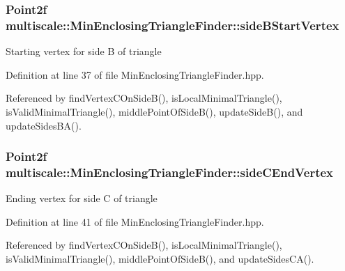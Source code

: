 \hypertarget{classmultiscale_1_1MinEnclosingTriangleFinder_a5f6c0f9361e4aab168f068f08b700742}{
\subsubsection[{side\-B\-Start\-Vertex}]{\setlength{\rightskip}{0pt plus 5cm}\-Point2f {\bf multiscale\-::\-Min\-Enclosing\-Triangle\-Finder\-::side\-B\-Start\-Vertex}}}\label{classmultiscale_1_1MinEnclosingTriangleFinder_a5f6c0f9361e4aab168f068f08b700742}
\-Starting vertex for side \-B of triangle 

\-Definition at line 37 of file \-Min\-Enclosing\-Triangle\-Finder.\-hpp.



\-Referenced by find\-Vertex\-C\-On\-Side\-B(), is\-Local\-Minimal\-Triangle(), is\-Valid\-Minimal\-Triangle(), middle\-Point\-Of\-Side\-B(), update\-Side\-B(), and update\-Sides\-B\-A().

\hypertarget{classmultiscale_1_1MinEnclosingTriangleFinder_a3f0f5bbef4e89caed8d153f1fc2eccea}{
\subsubsection[{side\-C\-End\-Vertex}]{\setlength{\rightskip}{0pt plus 5cm}\-Point2f {\bf multiscale\-::\-Min\-Enclosing\-Triangle\-Finder\-::side\-C\-End\-Vertex}}}\label{classmultiscale_1_1MinEnclosingTriangleFinder_a3f0f5bbef4e89caed8d153f1fc2eccea}
\-Ending vertex for side \-C of triangle 

\-Definition at line 41 of file \-Min\-Enclosing\-Triangle\-Finder.\-hpp.



\-Referenced by find\-Vertex\-C\-On\-Side\-B(), is\-Local\-Minimal\-Triangle(), is\-Valid\-Minimal\-Triangle(), middle\-Point\-Of\-Side\-B(), and update\-Sides\-C\-A().

